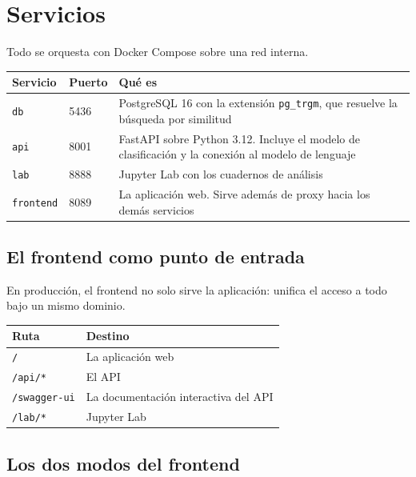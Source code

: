 \newpage
\section{Servicios}

Todo se orquesta con Docker Compose sobre una red interna.

\begin{center}
\begin{tabular}{@{}llp{6.5cm}@{}}
\toprule
\textbf{Servicio} & \textbf{Puerto} & \textbf{Qué es} \\
\midrule
\texttt{db}       & 5436 & PostgreSQL 16 con la extensión \texttt{pg\_trgm}, que resuelve la búsqueda por similitud \\
\texttt{api}      & 8001 & FastAPI sobre Python 3.12. Incluye el modelo de clasificación y la conexión al modelo de lenguaje \\
\texttt{lab}      & 8888 & Jupyter Lab con los cuadernos de análisis \\
\texttt{frontend} & 8089 & La aplicación web. Sirve además de proxy hacia los demás servicios \\
\bottomrule
\end{tabular}
\end{center}

\subsection{El frontend como punto de entrada}

En producción, el frontend no solo sirve la aplicación: unifica el acceso a todo
bajo un mismo dominio.

\begin{center}
\begin{tabular}{@{}ll@{}}
\toprule
\textbf{Ruta} & \textbf{Destino} \\
\midrule
\texttt{/}           & La aplicación web \\
\texttt{/api/*}      & El API \\
\texttt{/swagger-ui} & La documentación interactiva del API \\
\texttt{/lab/*}      & Jupyter Lab \\
\bottomrule
\end{tabular}
\end{center}

\subsection{Los dos modos del frontend}


